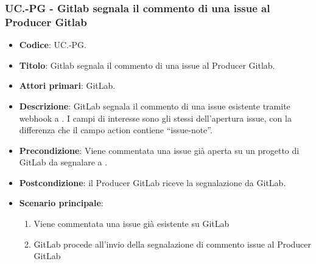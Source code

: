 \subsubsection{UC\theuccount.\thesubuccount-PG - Gitlab segnala il commento di una issue al Producer Gitlab}
\begin{itemize}
    \item \textbf{Codice}: UC\theuccount.\thesubuccount-PG.
    \item \textbf{Titolo}: Gitlab segnala il commento di una issue al Producer Gitlab.
    \item \textbf{Attori primari}: GitLab.
    \item \textbf{Descrizione}: GitLab segnala il commento di una issue esistente tramite webhook a \progetto.
    I campi di interesse sono gli stessi dell'apertura issue, con la differenza che il campo action contiene ``issue-note''.
    \item \textbf{Precondizione}: Viene commentata una issue già aperta su un
    progetto di GitLab da segnalare a \progetto.
    \item \textbf{Postcondizione}: il Producer GitLab riceve la segnalazione da GitLab.
    \item \textbf{Scenario principale}: 
    \begin{enumerate}
        \item Viene commentata una issue già esistente su GitLab
        \item GitLab procede all'invio della segnalazione di commento issue al Producer GitLab
    \end{enumerate}
    
\end{itemize}


